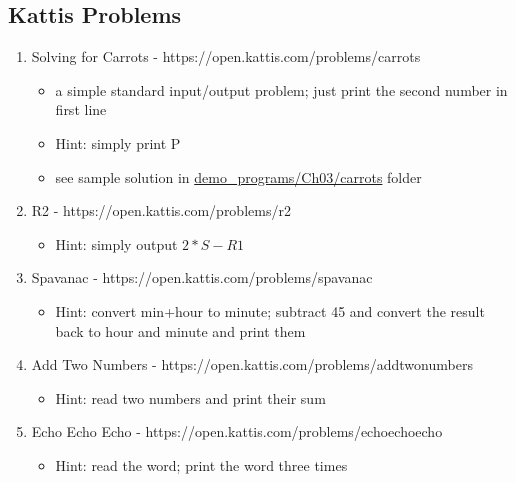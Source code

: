 \documentclass[11pt]{article}
\providecommand{\tightlist}{%
      \setlength{\itemsep}{0pt}\setlength{\parskip}{0pt}}
\begin{document}
\hypertarget{kattis-problems}{%
\subsection{Kattis Problems}\label{kattis-problems}}

\begin{enumerate}
\def\labelenumi{\arabic{enumi}.}
\tightlist
\item
  Solving for Carrots - https://open.kattis.com/problems/carrots

  \begin{itemize}
  \tightlist
  \item
    a simple standard input/output problem; just print the second number
    in first line
  \item
    Hint: simply print P
  \item
    see sample solution in \url{demo_programs/Ch03/carrots} folder
  \end{itemize}
\item
  R2 - https://open.kattis.com/problems/r2

  \begin{itemize}
  \tightlist
  \item
    Hint: simply output \(2*S-R1\)
  \end{itemize}
\item
  Spavanac - https://open.kattis.com/problems/spavanac

  \begin{itemize}
  \tightlist
  \item
    Hint: convert min+hour to minute; subtract 45 and convert the result
    back to hour and minute and print them
  \end{itemize}
\item
  Add Two Numbers - https://open.kattis.com/problems/addtwonumbers

  \begin{itemize}
  \tightlist
  \item
    Hint: read two numbers and print their sum
  \end{itemize}
\item
  Echo Echo Echo - https://open.kattis.com/problems/echoechoecho

  \begin{itemize}
  \tightlist
  \item
    Hint: read the word; print the word three times
  \end{itemize}
\end{enumerate}
\end{document}

